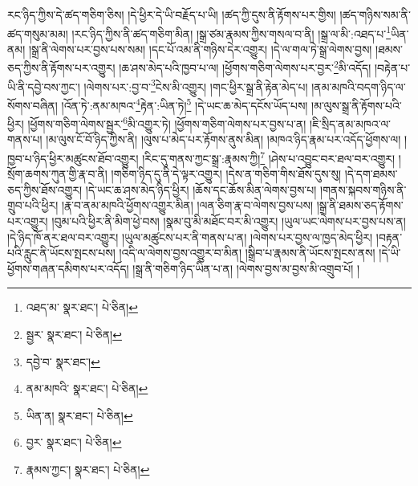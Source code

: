 རང་ཉིད་ཀྱིས་དེ་ཚད་གཅིག་ཅིས། །དེ་ཕྱིར་དེ་ཡི་བརྗོད་པ་ཡི། །ཚད་ཀྱི་དུས་ནི་རྟོགས་པར་གྱིས། །ཚད་གཉིས་སམ་ནི་ཚད་གསུམ་མམ། །རང་ཉིད་ཀྱིས་ནི་ཚད་གཅིག་མིན། །སྒྲ་ཙམ་རྣམས་ཀྱིས་གསལ་བ་ནི། །སྒྲ་ལ་མི་:འཐད་པ་\footnote{འཐད་མ་  སྣར་ཐང་།  པེ་ཅིན། }ཡིན་ནམ། །སྒྲ་ནི་ལེགས་པར་བྱས་པས་སམ། །དང་པོ་འམ་ནི་གཉིས་དེར་འགྱུར། །དེ་ལ་གལ་ཏེ་སྒྲ་ལེགས་བྱས། །ཐམས་ཅད་ཀྱིས་ནི་རྟོགས་པར་འགྱུར། །ཆ་ཤས་མེད་པའི་ཁྱབ་པ་ལ། །ཕྱོགས་གཅིག་ལེགས་པར་བྱར་\footnote{སྦྱར་  སྣར་ཐང་།  པེ་ཅིན། }མི་འདོད། །བརྟེན་པ་ཡི་ནི་དབྱེ་བས་ཀྱང་། །ལེགས་པར་:བྱ་བ་\footnote{དབྱེ་བ་  སྣར་ཐང་། }ངེས་མི་འགྱུར། །གང་ཕྱིར་སྒྲ་ནི་རྟེན་མེད་པ། །ནམ་མཁའི་བདག་ཉིད་ལ་སོགས་བཞིན། །འོན་ཏེ་:ནམ་མཁའ་\footnote{ནམ་མཁའི་  སྣར་ཐང་།  པེ་ཅིན། }རྟེན་:ཡིན་ཏེ།\footnote{ཡིན་ན།  སྣར་ཐང་།  པེ་ཅིན། } །དེ་ཡང་ཆ་མེད་དངོས་ཡོད་པས། །མ་ལུས་སྒྲ་ནི་རྟོགས་པའི་ཕྱིར། །ཕྱོགས་གཅིག་ལེགས་སྦྱར་\footnote{བྱར་  སྣར་ཐང་།  པེ་ཅིན། }མི་འགྱུར་ཏེ། །ཕྱོགས་གཅིག་ལེགས་པར་བྱས་པ་ན། །ཇི་སྲིད་ནམ་མཁའ་ལ་གནས་པ། །མ་ལུས་ངོ་བོ་ཉིད་ཀྱིས་ནི། །ལུས་པ་མེད་པར་རྟོགས་ནུས་མིན། །མཁའ་ཉིད་རྣམ་པར་འདོད་ཕྱོགས་ལ། །ཁྱབ་པ་ཉིད་ཕྱིར་མཚུངས་ཐོབ་འགྱུར། །རིང་དུ་གནས་ཀྱང་སྒྲ་:རྣམས་ཀྱི།\footnote{རྣམས་ཀྱང་།  སྣར་ཐང་།  པེ་ཅིན། } །ཤེས་པ་འབྱུང་བར་ཐལ་བར་འགྱུར། །སྲོག་ཆགས་ཀུན་གྱི་རྣ་བ་ནི། །གཅིག་ཉིད་དུ་ནི་དེ་ལྟར་འགྱུར། །དེས་ན་གཅིག་གིས་ཐོས་དུས་སུ། །དེ་དག་ཐམས་ཅད་ཀྱིས་ཐོས་འགྱུར། །དེ་ཡང་ཆ་ཤས་མེད་ཉིད་ཕྱིར། །ཆོས་དང་ཆོས་མིན་ལེགས་བྱས་པ། །གནས་སྐབས་གཉིས་ནི་གྲུབ་པའི་ཕྱིར། །རྣ་བ་ནམ་མཁའི་ཕྱོགས་འགྱུར་མིན། །ལན་ཅིག་རྣ་བ་ལེགས་བྱས་པས། །སྒྲ་ནི་ཐམས་ཅད་རྟོགས་པར་འགྱུར། །བུམ་པའི་ཕྱིར་ནི་མིག་ཕྱེ་བས། །སྣམ་བུ་མི་མཐོང་བར་མི་འགྱུར། །ཡུལ་ཡང་ལེགས་པར་བྱས་པས་ན། །དེ་ཉིད་ཁོ་ནར་ཐལ་བར་འགྱུར། །ཡུལ་མཚུངས་པར་ནི་གནས་པ་ན། །ལེགས་པར་བྱས་ལ་ཁྱད་མེད་ཕྱིར། །བརྟན་པའི་རླུང་ནི་ཡོངས་སྤངས་པས། །འདི་ལ་ལེགས་བྱས་འགྱུར་བ་མིན། །སྒྲིབ་པ་རྣམས་ནི་ཡོངས་སྤངས་ནས། །དེ་ཡི་ཕྱོགས་གཞན་དམིགས་པར་འདོད། །སྒྲ་ནི་གཅིག་ཉིད་ཡིན་པ་ན། །ལེགས་བྱས་མ་བྱས་མི་འགྲུབ་པོ། །
